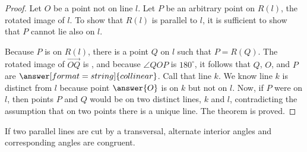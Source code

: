 \documentclass[nooutcomes]{ximera}
\begin{document}
\begin{problem}
\begin{proof}
Let $O$ be a point not on line $l$.  Let $P$ be an arbitrary point on $R(l)$, the rotated image of $l$.  
To show that $R(l)$ is parallel to $l$, 
it is sufficient to show that $P$ cannot lie also on $l$.  

\begin{image}
\end{image}

Because $P$ is on $R(l)$, there is a point $Q$ on $l$ such that $P = R(Q)$.  The rotated image of 
$\overrightarrow{OQ}$ is , and because $\angle QOP$ is $180^\circ$, it 
follows that $Q$, $O$, and $P$ are $\answer[format=string]{collinear}$.  Call that line $k$.  We know line $k$ is distinct 
from $l$ because point $\answer{O}$ is on $k$ but not on $l$.  Now, if $P$ were on $l$, then points $P$ and $Q$ 
would be on two distinct lines, $k$ and $l$, contradicting the assumption that on two points there 
is a unique line.  The theorem is proved.  
\end{proof}
\end{problem}

\begin{theorem}
If two parallel lines are cut by a transversal, alternate interior angles and corresponding angles are congruent.
\end{theorem}
\end{document}
